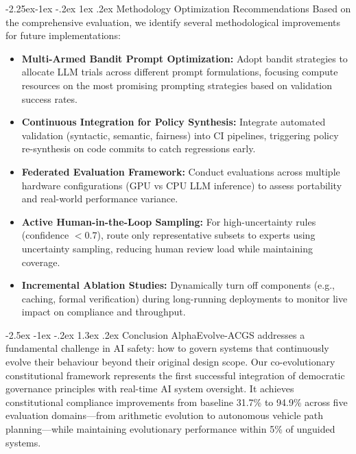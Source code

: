\documentclass[manuscript,screen,review,anonymous,9pt]{acmart}
\makeatletter
\renewcommand\section{\@startsection{section}{1}{\z@}%
  {-2.5ex \@plus -1ex \@minus -.2ex}%
  {1.3ex \@plus.2ex}%
  {\normalfont\Large\bfseries}}
\renewcommand\subsection{\@startsection{subsection}{2}{\z@}%
  {-2.25ex\@plus -1ex \@minus -.2ex}%
  {1ex \@plus .2ex}%
  {\normalfont\large\bfseries}}
\makeatother
\begin{document}
\subsection{Methodology Optimization Recommendations}
\label{subsec:methodology_optimization}
Based on the comprehensive evaluation, we identify several methodological improvements for future implementations:

\begin{itemize}
	\item \textbf{Multi-Armed Bandit Prompt Optimization:} Adopt bandit strategies to allocate LLM trials across different prompt formulations, focusing compute resources on the most promising prompting strategies based on validation success rates.
	\item \textbf{Continuous Integration for Policy Synthesis:} Integrate automated validation (syntactic, semantic, fairness) into CI pipelines, triggering policy re-synthesis on code commits to catch regressions early.
	\item \textbf{Federated Evaluation Framework:} Conduct evaluations across multiple hardware configurations (GPU vs CPU LLM inference) to assess portability and real-world performance variance.
	\item \textbf{Active Human-in-the-Loop Sampling:} For high-uncertainty rules (confidence $< 0.7$), route only representative subsets to experts using uncertainty sampling, reducing human review load while maintaining coverage.
	\item \textbf{Incremental Ablation Studies:} Dynamically turn off components (e.g., caching, formal verification) during long-running deployments to monitor live impact on compliance and throughput.
\end{itemize}

\section{Conclusion}
\label{sec:conclusion}
AlphaEvolve-ACGS addresses a fundamental challenge in AI safety: how to govern systems that continuously evolve their behaviour beyond their original design scope. Our co-evolutionary constitutional framework represents the first successful integration of democratic governance principles with real-time AI system oversight. It achieves constitutional compliance improvements from baseline 31.7\% to 94.9\% across five evaluation domains---from arithmetic evolution to autonomous vehicle path planning---while maintaining evolutionary performance within 5\% of unguided systems.
\end{document}

